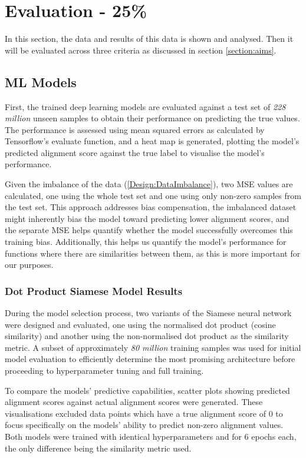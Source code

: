 \chapter{Evaluation - 25\%}
In this section, the data and results of this data is shown and analysed. Then it will be evaluated across three criteria as discussed in section \ref{section:aims}.

\section{ML Models}
First, the trained deep learning models are evaluated against a test set of \textit{228 million} unseen samples to obtain their performance on predicting the true values. The performance is assessed using mean squared errors as calculated by Tensorflow's evaluate function, and a heat map is generated, plotting the model's predicted alignment score against the true label to visualise the model's performance.

Given the imbalance of the data (\ref{Design:DataImbalance}), two MSE values are calculated, one using the whole test set and one using only non-zero samples from the test set. This approach addresses bias compensation, the imbalanced dataset might inherently bias the model toward predicting lower alignment scores, and the separate MSE helps quantify whether the model successfully overcomes this training bias. Additionally, this helps us quantify the model's performance for functions where there are similarities between them, as this is more important for our purposes.

\subsection{Dot Product Siamese Model Results}
During the model selection process, two variants of the Siamese neural network were designed and evaluated, one using the normalised dot product (cosine similarity) and another using the non-normalised dot product as the similarity metric. A subset of approximately \textit{80 million} training samples was used for initial model evaluation to efficiently determine the most promising architecture before proceeding to hyperparameter tuning and full training.

To compare the models' predictive capabilities, scatter plots showing predicted alignment scores against actual alignment scores were generated. These visualisations excluded data points which have a true alignment score of 0 to focus specifically on the models' ability to predict non-zero alignment values. Both models were trained with identical hyperparameters and for 6 epochs each, the only difference being the similarity metric used.

